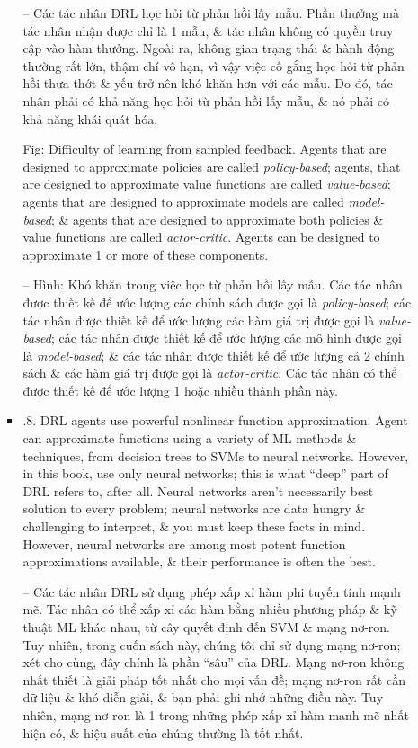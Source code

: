 \documentclass{article}
\begin{document}
\begin{itemize}
\begin{itemize}
\begin{itemize}
            -- {\sf Các tác nhân DRL học hỏi từ phản hồi lấy mẫu.} Phần thưởng mà tác nhân nhận được chỉ là 1 mẫu, \& tác nhân không có quyền truy cập vào hàm thưởng. Ngoài ra, không gian trạng thái \& hành động thường rất lớn, thậm chí vô hạn, vì vậy việc cố gắng học hỏi từ phản hồi thưa thớt \& yếu trở nên khó khăn hơn với các mẫu. Do đó, tác nhân phải có khả năng học hỏi từ phản hồi lấy mẫu, \& nó phải có khả năng khái quát hóa.

            {\sf Fig: Difficulty of learning from sampled feedback.} Agents that are designed to approximate policies are called {\it policy-based}; agents, that are designed to approximate value functions are called {\it value-based}; agents that are designed to approximate models are called {\it model-based}; \& agents that are designed to approximate both policies \& value functions are called {\it actor-critic}. Agents can be designed to approximate 1 or more of these components.

            -- {\sf Hình: Khó khăn trong việc học từ phản hồi lấy mẫu.} Các tác nhân được thiết kế để ước lượng các chính sách được gọi là {\it policy-based}; các tác nhân được thiết kế để ước lượng các hàm giá trị được gọi là {\it value-based}; các tác nhân được thiết kế để ước lượng các mô hình được gọi là {\it model-based}; \& các tác nhân được thiết kế để ước lượng cả 2 chính sách \& các hàm giá trị được gọi là {\it actor-critic}. Các tác nhân có thể được thiết kế để ước lượng 1 hoặc nhiều thành phần này.
            \item {.8. DRL agents use powerful nonlinear function approximation.} Agent can approximate functions using a variety of ML methods \& techniques, from decision trees to SVMs to neural networks. However, in this book, use only neural networks; this is what ``deep'' part of DRL refers to, after all. Neural networks aren't necessarily best solution to every problem; neural networks are data hungry \& challenging to interpret, \& you must keep these facts in mind. However, neural networks are among most potent function approximations available, \& their performance is often the best.

            -- {\sf Các tác nhân DRL sử dụng phép xấp xỉ hàm phi tuyến tính mạnh mẽ.} Tác nhân có thể xấp xỉ các hàm bằng nhiều phương pháp \& kỹ thuật ML khác nhau, từ cây quyết định đến SVM \& mạng nơ-ron. Tuy nhiên, trong cuốn sách này, chúng tôi chỉ sử dụng mạng nơ-ron; xét cho cùng, đây chính là phần ``sâu'' của DRL. Mạng nơ-ron không nhất thiết là giải pháp tốt nhất cho mọi vấn đề; mạng nơ-ron rất cần dữ liệu \& khó diễn giải, \& bạn phải ghi nhớ những điều này. Tuy nhiên, mạng nơ-ron là 1 trong những phép xấp xỉ hàm mạnh mẽ nhất hiện có, \& hiệu suất của chúng thường là tốt nhất.


\end{itemize}
\end{itemize}
\end{itemize}
\end{document}
